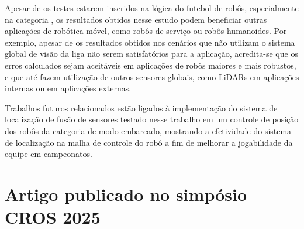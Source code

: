 \documentclass[acronym, symbols, table]{fei}
\begin{document}
	Apesar de os testes estarem inseridos na lógica do futebol de robôs, especialmente na categoria , os resultados obtidos nesse estudo podem beneficiar outras aplicações de robótica móvel, como robôs de serviço ou robôs humanoides. Por exemplo, apesar de os resultados obtidos nos cenários que não utilizam o sistema global de visão da liga não serem satisfatórios para a aplicação, acredita-se que os erros calculados sejam aceitáveis em aplicações de robôs maiores e mais robustos, e que até fazem utilização de outros sensores globais, como LiDARs em aplicações internas ou  em aplicações externas.
	
	Trabalhos futuros relacionados estão ligados à implementação do sistema de localização de fusão de sensores testado nesse trabalho em um controle de posição dos robôs da categoria de modo embarcado, mostrando a efetividade do sistema de localização na malha de controle do robô a fim de melhorar a jogabilidade da equipe em campeonatos.
	
\printbibliography

\anexos

\chapter{Artigo publicado no simpósio CROS 2025}

%
%

%

\end{document}

